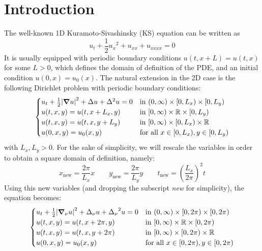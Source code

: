 \documentclass[twoside]{article}
\begin{document}
\section{Introduction}
The well-known 1D Kuramoto-Sivashinsky (KS) equation can be written as
\begin{equation}
  u_t + \frac{1}{2} {u_x}^2 + u_{xx} + u_{xxxx} = 0
\end{equation}
It is usually equipped with periodic boundary conditions $u(t, x + L) = u(t, x)$ for some $L > 0$, which defines the domain of definition of the PDE, and an initial condition $u(0, x) = u_0(x)$. The natural extension in the 2D case is the following Dirichlet problem with periodic boundary conditions:
\begin{equation}
  \begin{cases}
    u_t + \frac{1}{2} \abs{\grad u}^2 + \Delta u + \Delta^2 u = 0 & \text{in } (0, \infty) \times [0, L_x) \times [0, L_y) \\
    u(t, x, y) = u(t, x + L_x, y)                                         & \text{in } [0, \infty) \times \mathbb{R} \times [0, L_y)      \\
    u(t, x, y) = u(t, x, y + L_y)                                         & \text{in } [0, \infty) \times [0, L_x) \times \mathbb{R}      \\
    u(0, x, y) = u_0(x, y)                                                & \text{for all } x \in [0, L_x), y \in [0, L_y)
  \end{cases}
\end{equation}
with $L_x, L_y > 0$. For the sake of simplicity, we will rescale the variables in order to obtain a square domain of definition, namely:
\begin{equation}
  x_\mathrm{new} = \frac{2\pi}{L_x} x \qquad y_\mathrm{new} = \frac{2\pi}{L_y} y \qquad t_\mathrm{new} = {\left(\frac{L_x}{2 \pi}\right)}^2 t
\end{equation}
Using this new variables (and dropping the subscript \emph{new} for simplicity), the equation becomes:
\begin{equation}\label{eq:2d_ks}
  \begin{cases}
    u_t + \frac{1}{2} \abs{\grad_\nu u}^2 + \Delta_\nu u + {\Delta_\nu}^2 u = 0 & \text{in } (0, \infty) \times [0, 2\pi) \times [0, 2\pi) \\
    u(t, x, y) = u(t, x + 2\pi, y)                                                      & \text{in } [0, \infty) \times \mathbb{R} \times [0, 2\pi)       \\
    u(t, x, y) = u(t, x, y + 2\pi)                                                      & \text{in } [0, \infty) \times [0, 2\pi) \times \mathbb{R}       \\
    u(0, x, y) = u_0(x, y)                                                              & \text{for all } x \in [0, 2\pi), y \in [0, 2\pi)
  \end{cases}
\end{equation}
\end{document}
